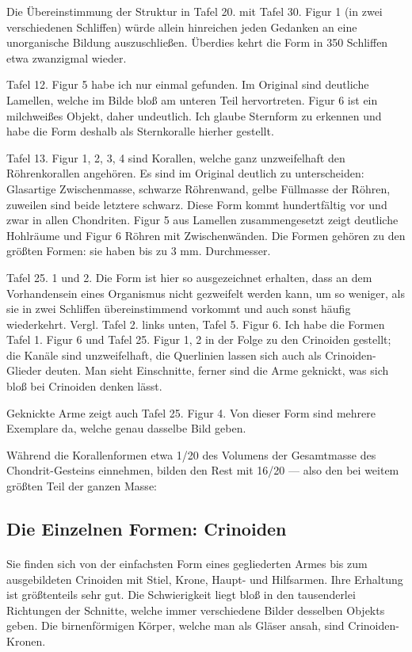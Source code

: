 \documentclass[a4paper, 12pt, oneside]{article}
\begin{document}
Die Übereinstimmung der Struktur in Tafel 20. mit Tafel 30. Figur 1 (in zwei verschiedenen Schliffen) würde allein hinreichen jeden Gedanken an eine unorganische Bildung auszuschließen. Überdies kehrt die Form in 350 Schliffen etwa zwanzigmal wieder.

Tafel 12. Figur 5 habe ich nur einmal gefunden. Im Original sind deutliche Lamellen, welche im Bilde bloß am unteren Teil hervortreten. Figur 6 ist ein milchweißes Objekt, daher undeutlich. Ich glaube Sternform zu erkennen und habe die Form deshalb als Sternkoralle hierher gestellt.

Tafel 13. Figur 1, 2, 3, 4 sind Korallen, welche ganz unzweifelhaft den Röhrenkorallen angehören. Es sind im Original deutlich zu unterscheiden: Glasartige Zwischenmasse, schwarze Röhrenwand, gelbe Füllmasse der Röhren, zuweilen sind beide letztere schwarz. Diese Form kommt hundertfältig vor und zwar in allen Chondriten. Figur 5 aus Lamellen zusammengesetzt zeigt deutliche Hohlräume und Figur 6 Röhren mit Zwischenwänden. Die Formen gehören zu den größten Formen: sie haben bis zu 3 mm. Durchmesser.

Tafel 25. 1 und 2. Die Form ist hier so ausgezeichnet erhalten, dass an dem Vorhandensein eines Organismus nicht gezweifelt werden kann, um so weniger, als sie in zwei Schliffen übereinstimmend vorkommt und auch sonst häufig wiederkehrt. Vergl. Tafel 2. links unten, Tafel 5. Figur 6. Ich habe die Formen Tafel 1. Figur 6 und Tafel 25. Figur 1, 2 in der Folge zu den Crinoiden gestellt; die Kanäle sind unzweifelhaft, die Querlinien lassen sich auch als Crinoiden-Glieder deuten. Man sieht Einschnitte, ferner sind die Arme geknickt, was sich bloß bei Crinoiden denken lässt.

Geknickte Arme zeigt auch Tafel 25. Figur 4. Von dieser Form sind mehrere Exemplare da, welche genau dasselbe Bild geben.

Während die Korallenformen etwa 1/20 des Volumens der Gesamtmasse des Chondrit-Gesteins einnehmen, bilden den Rest mit 16/20 — also den bei weitem größten Teil der ganzen Masse:
\clearpage
\subsection{Die Einzelnen Formen: Crinoiden}
\paragraph{}
Sie finden sich von der einfachsten Form eines gegliederten Armes bis zum ausgebildeten Crinoiden mit Stiel, Krone, Haupt- und Hilfsarmen. Ihre Erhaltung ist größtenteils sehr gut. Die Schwierigkeit liegt bloß in den tausenderlei Richtungen der Schnitte, welche immer verschiedene Bilder desselben Objekts geben. Die birnenförmigen Körper, welche man als Gläser ansah, sind Crinoiden-Kronen.
\end{document}
